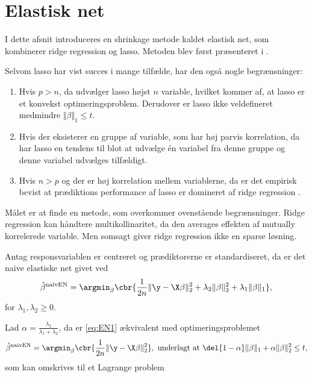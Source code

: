 \section{Elastisk net}
I dette afsnit introduceres en shrinkage metode kaldet elastisk net, som kombinerer ridge regression og lasso.
Metoden blev først præsenteret i \citep{zou_hastie}.

Selvom lasso har vist succes i mange tilfælde, har den også nogle begrænsninger:
%
\begin{enumerate}[label=\textnormal{(\arabic*)}]
    \item Hvis $p>n$, da udvælger lasso højst $n$ variable, hvilket kommer af, at lasso er et konvekst optimeringsproblem. Derudover er lasso ikke veldefineret medmindre \(\Vert \beta \Vert_1 \leq t\). \label{itm:1}
    \item Hvis der eksisterer en gruppe af variable, som har høj parvis korrelation, da har lasso en tendens til blot at udvælge  én variabel fra denne gruppe og denne variabel udvælges tilfældigt. \label{itm:2}
    \item Hvis $n>p$ og der er høj korrelation mellem variablerne, da er det empirisk bevist at prædiktions performance af lasso er domineret af ridge regression \citep{lasso}.  \label{itm:3}
\end{enumerate}
%
Målet er at finde en metode, som overkommer ovenstående begrænsninger.
Ridge regression kan håndtere multikollinaritet, da den averages effekten af mutually korrelerede variable.
Men somsagt giver ridge regression ikke en sparse løsning.
%
\begin{defn}
Antag responsvariablen er centreret og prædiktorerne er standardiseret, da er det naive elastiske net givet ved
\begin{align}
\hat{\beta}^\text{naivEN} = \argmin_{\beta} \cbr{ \frac{1}{2n} \Vert \y - \X \beta \Vert_2^2 + \lambda_2 \Vert \beta \Vert_2^2 + \lambda_1 \Vert \beta \Vert_1}, \label{eq:EN1}
\end{align}
for \(\lambda_1, \lambda_2 \geq 0\).
\end{defn}
%
Lad \(\alpha = \frac{\lambda_2}{\lambda_1 + \lambda_2}\), da er \eqref{eq:EN1} ækvivalent med optimeringsproblemet
\begin{align*}
\hat{\beta}^\text{naivEN} = \argmin_{\beta} \cbr{\frac{1}{2n} \Vert \y - \X \beta \Vert_2^2}, \ \text{underlagt at } \del{1-\alpha} \Vert \beta \Vert_1 + \alpha \Vert \beta \Vert_2^2 \leq t,
\end{align*}
som kan omskrives til et Lagrange problem
